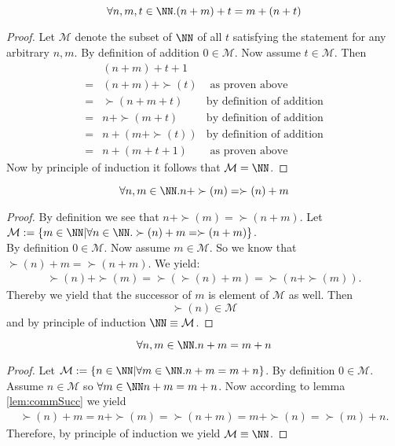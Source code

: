 \begin{lem}
	\label{lem:assoAdd}
	\[\forall n, m, t\in\NN.(n+m)+t=m+(n+t)\]
\end{lem}
\begin{proof}
	Let $\mathcal{M}$ denote the subset of $\NN$ of all $t$ satisfying the statement for any arbitrary $n, m$. 
	By definition of addition $0\in \mathcal{M}$.
	Now assume $t\in\mathcal{M}$. Then 
	\begin{align*}
	&(n+m)+t+1\\
	=&(n+m)+\succ(t) &\text{ as proven above}\\
	=&\succ(n+m+t) &\text{by definition of addition}\\
	=&n+\succ(m+t) &\text{by definition of addition}\\
	=&n+(m+\succ(t)) &\text{by definition of addition}\\
	=&n+(m+t+1) &\text{ as proven above}
	\end{align*}
	Now by principle of induction it follows that $\mathcal{M}=\NN$. 
\end{proof}
\begin{lem}
	\label{lem:commSucc}
	\[\forall n, m\in \NN.n+\succ(m)=\succ(n)+m \]
\end{lem}
\begin{proof}
	By definition we see that $n+\succ(m)=\succ(n+m)$. 
	Let $\mathcal{M}:=\{m\in\NN|\forall n\in\NN.\succ(n)+m=\succ(n+m)\}$. \\
	By definition $0\in\mathcal{M}$. Now assume $m \in \mathcal{M}$. So we know that $\succ(n)+m=\succ(n+m)$. We yield:
	\begin{align*}
	\succ(n)+\succ(m)=\succ(\succ(n)+m)=\succ(n+\succ(m)).
	\end{align*}
	Thereby we yield that the successor of $m$ is element of $\mathcal{M}$ as well. 
	Then \[\succ(n)\in\mathcal{M}\] and by principle of induction $\NN\equiv \mathcal{M}$.
\end{proof}
\begin{lem}
	\label{lem:comAdd}
	\[\forall n, m\in\NN.n+m=m+n\]
\end{lem}
\begin{proof}
	Let $\mathcal{M}:=\{n\in\NN|\forall m\in\NN.n+m=m+n\}$.
	By definition $0\in\mathcal{M}$. Assume $n\in\mathcal{M}$ so $\forall m\in\NN n+m=m+n$.
	Now according to lemma \ref{lem:commSucc} we yield 
	\begin{align*}
	\succ(n)+m=n+\succ(m)=\succ(n+m)=m+\succ(n)=\succ(m)+n.
	\end{align*}
	Therefore, by principle of induction we yield $\mathcal{M}\equiv\NN$. 
\end{proof}
